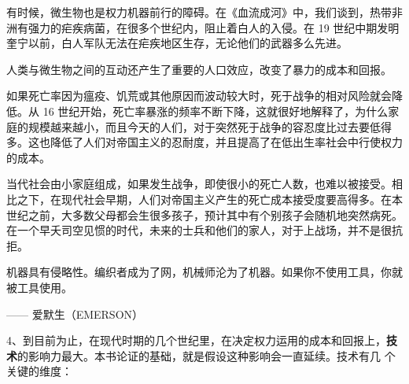 有时候，微生物也是权力机器前行的障碍。在《血流成河》中，我们谈到，热带非洲有强力的疟疾病菌，在很多个世纪内，阻止着白人的入侵。在 19 世纪中期发明奎宁以前，白人军队无法在疟疾地区生存，无论他们的武器多么先进。

人类与微生物之间的互动还产生了重要的人口效应，改变了暴力的成本和回报。

如果死亡率因为瘟疫、饥荒或其他原因而波动较大时，死于战争的相对风险就会降低。从 16 世纪开始，死亡率暴涨的频率不断下降，这就很好地解释了，为什么家庭的规模越来越小，而且今天的人们，对于突然死于战争的容忍度比过去要低得多。这也降低了人们对帝国主义的忍耐度，并且提高了在低出生率社会中行使权力的成本。

当代社会由小家庭组成，如果发生战争，即使很小的死亡人数，也难以被接受。相比之下，在现代社会早期，人们对帝国主义产生的死亡成本接受度要高得多。在本世纪之前，大多数父母都会生很多孩子，预计其中有个别孩子会随机地突然病死。在一个早夭司空见惯的时代，未来的士兵和他们的家人，对于上战场，并不是很抗拒。

\begin{tcolorbox}
\kaishu 机器具有侵略性。编织者成为了网，机械师沦为了机器。如果你不使用工具，你就被工具使用。
\begin{flushright}
—— 爱默生（EMERSON）
\end{flushright}
\end{tcolorbox}

4、到目前为止，在现代时期的几个世纪里，在决定权力运用的成本和回报上，\textbf{技术}的影响力最大。本书论证的基础，就是假设这种影响会一直延续。技术有几 个关键的维度：

